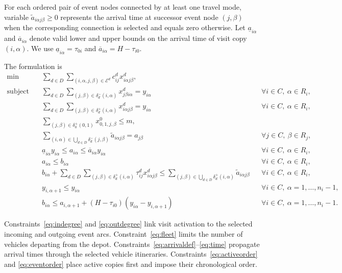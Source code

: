 \documentclass[10pt]{article}
\begin{document}
For each ordered pair of event nodes connected by at least one travel mode, variable $\widetilde a_{i\alpha j\beta}\ge0$ represents the arrival time at successor event node $(j,\beta)$ when the corresponding connection is selected and equals zero otherwise. Let $\underline a_{i\alpha}$ and $\overline a_{i\alpha}$ denote valid lower and upper bounds on the arrival time of visit copy $(i,\alpha)$. We use $\underline a_{i\alpha}=\tau_{0i}$ and $\overline a_{i\alpha}=H-\tau_{i0}$.

The formulation is
\begin{align}
\min\quad
&\sum_{d\in D}
\sum_{(i,\alpha,j,\beta)\in\mathcal E^d}
c_{ij}^d x^d_{i\alpha j\beta},
\label{eq:obj}\\
\text{subject to}\quad
&\sum_{d\in D}
\sum_{(j,\beta)\in\delta_d^-(i,\alpha)}
x^d_{j\beta i\alpha}
=
y_{i\alpha}
&&\forall i\in C,\ \alpha\in R_i,
\label{eq:indegree}\\
&\sum_{d\in D}
\sum_{(j,\beta)\in\delta_d^+(i,\alpha)}
x^d_{i\alpha j\beta}
=
y_{i\alpha}
&&\forall i\in C,\ \alpha\in R_i,
\label{eq:outdegree}\\
&\sum_{(j,\beta)\in\delta_0^+(0,1)}
x^0_{0,1,j,\beta}
\le m,
\label{eq:fleet}\\
&\sum_{(i,\alpha)\in\bigcup_{d\in D}\delta_d^-(j,\beta)}
\widetilde a_{i\alpha j\beta}
=
a_{j\beta}
&&\forall j\in C,\ \beta\in R_j,
\label{eq:arrivaldef}\\
&\underline a_{i\alpha}y_{i\alpha}
\le a_{i\alpha}
\le \overline a_{i\alpha}y_{i\alpha}
&&\forall i\in C,\ \alpha\in R_i,
\label{eq:arrivalbounds}\\
&a_{i\alpha}\le b_{i\alpha}
&&\forall i\in C,\ \alpha\in R_i,
\label{eq:service}\\
&b_{i\alpha}
+
\sum_{d\in D}
\sum_{(j,\beta)\in\delta_d^+(i,\alpha)}
\tau_{ij}^d x^d_{i\alpha j\beta}
\le
\sum_{(j,\beta)\in\bigcup_{d\in D}\delta_d^+(i,\alpha)}
\widetilde a_{i\alpha j\beta}
&&\forall i\in C,\ \alpha\in R_i,
\label{eq:time}\\
&y_{i,\alpha+1}\le y_{i\alpha}
&&\forall i\in C,\ \alpha=1,\ldots,n_i-1,
\label{eq:activeorder}\\
&b_{i\alpha}
\le
a_{i,\alpha+1}
+
(H-\tau_{i0})
(y_{i\alpha}-y_{i,\alpha+1})
&&\forall i\in C,\ \alpha=1,\ldots,n_i-1.
\label{eq:eventorder}
\end{align}

Constraints~\eqref{eq:indegree} and \eqref{eq:outdegree} link visit activation to the selected incoming and outgoing event arcs. Constraint~\eqref{eq:fleet} limits the number of vehicles departing from the depot. Constraints~\eqref{eq:arrivaldef}--\eqref{eq:time} propagate arrival times through the selected vehicle itineraries. Constraints~\eqref{eq:activeorder} and \eqref{eq:eventorder} place active copies first and impose their chronological order.
\end{document}
